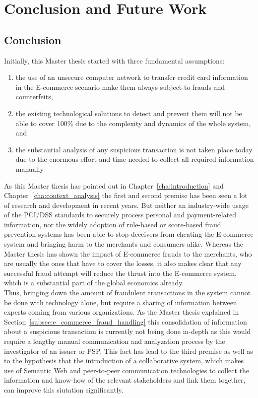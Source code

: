 
\chapter{Conclusion and Future Work} %
\label{cha:conclusion}

\section{Conclusion}
\label{sec:conclusion}

Initially, this Master thesis started with three fundamental assumptions: \@

\begin{enumerate}
	\item the use of an unsecure computer network to transfer credit card information in the \gls{E-commerce} scenario make them always subject to frauds and counterfeits,
	\item the existing technological solutions to detect and prevent them will not be able to cover 100\% due to the complexity and dynamics of the whole system, and
	\item the substantial analysis of any suspicious transaction is not taken place today due to the enormous effort and time needed to collect all required information manually
\end{enumerate}

As this Master thesis has pointed out in Chapter~\ref{cha:introduction} and Chapter~\ref{cha:context_analysis} the first and second premise has been seen a lot of research and development in recent years. But neither an industry-wide usage of the \gls{PCI/DSS} standards to securely process personal and payment-related information, nor the widely adoption of rule-based or score-based fraud prevention systems has been able to stop deceivers from cheating the \gls{E-commerce} system and bringing harm to the merchants and consumers alike. Whereas the Master thesis has shown the impact of \gls{E-commerce} frauds to the merchants, who are usually the ones that have to cover the losses, it also makes clear that any successful fraud attempt will reduce the thrust into the \gls{E-commerce} system, which is a substantial part of the global economics already. \\

Thus, bringing down the amount of fraudulent transactions in the system cannot be done with technology alone, but require a sharing of information between experts coming from various organizations. As the Master thesis explained in Section~\ref{subsec:e_commerce_fraud_handling} this consolidation of information about a suspicious transaction is currently not being done in-depth as this would require a lengthy manual communication and analyzation process by the investigator of an issuer or \gls{PSP}. This fact has lead to the third premise as well as to the hypothesis that the introduction of a collaborative system, which makes use of Semantic Web and peer-to-peer communication technologies to collect the information and know-how of the relevant stakeholders and link them together, can improve this siutation significantly. \\

